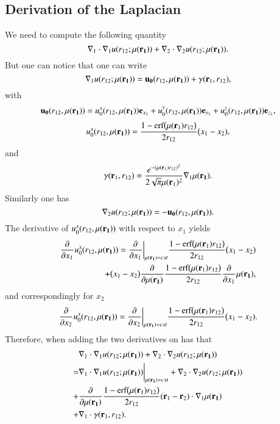\documentclass[aip,jcp,reprint,noshowkeys,superscriptaddress]{revtex4-1}
\newcommand{\deriv}[3]{\frac{\partial^{#3} #1}{\partial {#2}^{#3}}}
\newcommand{\br}[0]{{\bf {r}}}
\newcommand{\bri}[1]{{\bf r}_{#1}}
\newcommand{\mur}[1]{\mu({\bf r_{#1}})}
\begin{document}
\subsection{Derivation of the Laplacian}
We need to compute the following quantity 
\begin{equation}
 \nabla_1 \cdot \nabla_1 u(r_{12};\mur{1}) + \nabla_2 \cdot \nabla_2 u(r_{12};\mur{1}).
\end{equation}
But one can notice that one can write 
\begin{equation}
 \nabla_1 u(r_{12};\mur{1})  = {\bf u_0}(r_{12},\mur{1}) + {\bf \gamma}(\br_1, r_{12}), 
\end{equation}
with 
\begin{equation}
 {\bf u_0}(r_{12},\mur{1}) = u_0^x(r_{12},\mur{1}) {\bf e}_{x_1} + u_0^y(r_{12},\mur{1}) {\bf e}_{y_1} + u_0^z(r_{12},\mur{1}) {\bf e}_{z_1}, 
\end{equation}
\begin{equation}
 u_0^x(r_{12},\mur{1}) = \frac{1 - \text{erf}\big(\mu(\bri{1}) r_{12} \big)}{2 r_{12}}\big( x_1 - x_2),
\end{equation}
and
\begin{equation}
 {\bf {\gamma}}(\br_1, r_{12}) = \frac{e^{-(\mu(\bri{1}) r_{12})^2}}{2 \sqrt{\pi} \mu(\bri{1})^2} \nabla_1{\mur{1}}.
\end{equation}
Similarly one has 
\begin{equation}
 \nabla_2 u(r_{12};\mur{1}) = - {\bf u_0}(r_{12},\mur{1}).
\end{equation}
The derivative of $u_0^x(r_{12},\mur{1})$ with respect to $x_1$ yields 
\begin{equation}
 \begin{aligned}
  \deriv{}{x_1}{} u_0^x(r_{12},\mur{1}) = \deriv{}{x_1}{}\bigg|_{\mur{1}=cst} \frac{1 - \text{erf}\big(\mu(\bri{1}) r_{12} \big)}{2 r_{12}}\big( x_1 - x_2) \\ 
 + \big( x_1 - x_2\big)\deriv{}{\mur{1}}{}\frac{1 - \text{erf}\big(\mu(\bri{1}) r_{12} \big)}{2 r_{12}} \deriv{}{x_1}{} \mur{1},
 \end{aligned}
\end{equation}
and correspondingly for $x_2$ 
\begin{equation}
 \deriv{}{x_2}{} u_0^x(r_{12},\mur{1}) = \deriv{}{x_2}{}\bigg|_{\mur{1}=cst} \frac{1 - \text{erf}\big(\mu(\bri{1}) r_{12} \big)}{2          r_{12}}\big( x_1 - x_2).
\end{equation}
Therefore, when adding  the two derivatives on has that 
\begin{equation}
 \label{eq:lapl_tot}
 \begin{aligned}
& \nabla_1 \cdot \nabla_1 u(r_{12};\mur{1}) + \nabla_2 \cdot \nabla_2 u(r_{12};\mur{1})   \\
= &\nabla_1 \cdot \nabla_1 u(r_{12};\mur{1})\bigg|_{\mur{1}=cst} + \nabla_2 \cdot \nabla_2 u(r_{12};\mur{1}) \\
+ &\deriv{}{\mur{1}}{}\frac{1 - \text{erf}\big(\mu(\bri{1}) r_{12} \big)}{2 r_{12}} (\br_1 - \br_2) \cdot \nabla_1 \mur{1} \\
+& \nabla_1 \cdot {\bf \gamma}(\br_1, r_{12}). 
 \end{aligned}
\end{equation}
\end{document}
